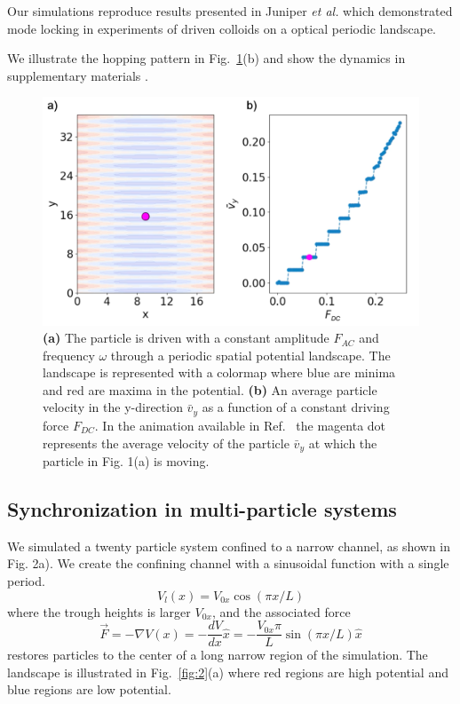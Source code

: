 \documentclass[twocolumn,preprintnumbers,amsmath,amssymb,aps,prx]{revtex4}
\begin{document}
Our simulations reproduce results presented in 
Juniper {\it et al.} \cite{juniper2015}
which demonstrated
mode locking in
experiments of 
driven colloids on a
optical periodic landscape.

We illustrate the hopping pattern in Fig.~\ref{fig:1}(b)
and 
show the dynamics 
in supplementary materials \cite{supp1}.

\begin{center}
\begin{figure}[h!]
\centering
\includegraphics[scale=.25]{single}
\caption{\textbf{(a)} The particle is driven with a constant amplitude $F_{AC}$ and frequency $\omega$ through a periodic spatial potential landscape.  The landscape is represented with a colormap where blue are minima and red are maxima in the potential. \textbf{(b)} An average particle velocity in the y-direction $\bar{v}_{y}$ as a function of a constant driving force $F_{DC}$. In the animation available in Ref.~\cite{supp1} the magenta dot represents the average velocity of the particle $\bar{v}_{y}$ at which the particle in Fig. 1(a) is moving.}
\label{fig:1}
\end{figure}
\end{center}

\subsection{Synchronization in multi-particle systems}
\label{sec:sync}

We simulated a twenty particle system confined to a narrow channel, as shown in Fig. 2a).  We create the confining channel with a sinusoidal function
with a single period.
\begin{equation}
  \label{eq:channel}
  V_l(x) = V_{0x} \cos{(\pi x/L)}
\end{equation}
where the trough heights is larger  $V_{0x}$,
and the associated force
\begin{equation}
\vec{F}=-\nabla V(x) = -\frac{dV}{dx} \hat{x} = - \frac{V_{0x} \pi}{L} \sin{(\pi x/L)} \hat{x}
\end{equation}
restores particles to the center of a long narrow region of the simulation.
The landscape is illustrated in Fig.~\ref{fig:2}(a)
where red regions are high potential
and blue regions are low potential.
\end{document}
